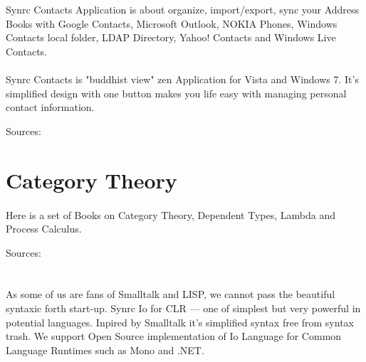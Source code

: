 \documentclass[11pt]{article}
\begin{document}
\section*{}
\paragraph{}
Synrc Contacts Application is about organize,
import/export, sync your Address Books with Google Contacts,
Microsoft Outlook, NOKIA Phones, Windows Contacts local folder,
LDAP Directory, Yahoo! Contacts and Windows Live Contacts.
\paragraph{}
Synrc Contacts is "buddhist view" zen Application for
Vista and Windows 7. It's simplified design with one button
makes you life easy with managing personal contact information.

Sources: 



\section*{Category Theory}
\paragraph{}
Here is a set of Books on Category Theory, Dependent Types, Lambda and Process Calculus.

Sources: 

\section*{}

\paragraph{}
As some of us are fans of Smalltalk and LISP, we cannot pass the
beautiful syntaxic forth start-up. Synrc Io for CLR --- one of simplest but very
powerful in potential languages. Inpired by Smalltalk it's simplified
syntax free from syntax trash. We support Open Source implementation
of Io Language for Common Language Runtimes such as Mono and .NET.
\end{document}
